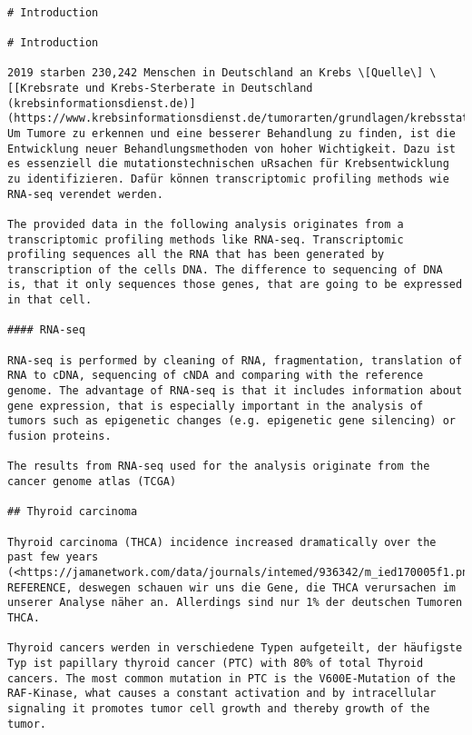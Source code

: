 \documentclass[
  parskip,
  oneside]{scrreprt}
\begin{document}
\begin{verbatim}

# Introduction

# Introduction

2019 starben 230,242 Menschen in Deutschland an Krebs \[Quelle\] \[[Krebsrate und Krebs-Sterberate in Deutschland (krebsinformationsdienst.de)](https://www.krebsinformationsdienst.de/tumorarten/grundlagen/krebsstatistiken.php)\]. Um Tumore zu erkennen und eine besserer Behandlung zu finden, ist die Entwicklung neuer Behandlungsmethoden von hoher Wichtigkeit. Dazu ist es essenziell die mutationstechnischen uRsachen für Krebsentwicklung zu identifizieren. Dafür können transcriptomic profiling methods wie RNA-seq verendet werden.

The provided data in the following analysis originates from a transcriptomic profiling methods like RNA-seq. Transcriptomic profiling sequences all the RNA that has been generated by transcription of the cells DNA. The difference to sequencing of DNA is, that it only sequences those genes, that are going to be expressed in that cell.

#### RNA-seq

RNA-seq is performed by cleaning of RNA, fragmentation, translation of RNA to cDNA, sequencing of cNDA and comparing with the reference genome. The advantage of RNA-seq is that it includes information about gene expression, that is especially important in the analysis of tumors such as epigenetic changes (e.g. epigenetic gene silencing) or fusion proteins.

The results from RNA-seq used for the analysis originate from the cancer genome atlas (TCGA)

## Thyroid carcinoma 

Thyroid carcinoma (THCA) incidence increased dramatically over the past few years (<https://jamanetwork.com/data/journals/intemed/936342/m_ied170005f1.png>) REFERENCE, deswegen schauen wir uns die Gene, die THCA verursachen im unserer Analyse näher an. Allerdings sind nur 1% der deutschen Tumoren THCA.

Thyroid cancers werden in verschiedene Typen aufgeteilt, der häufigste Typ ist papillary thyroid cancer (PTC) with 80% of total Thyroid cancers. The most common mutation in PTC is the V600E-Mutation of the RAF-Kinase, what causes a constant activation and by intracellular signaling it promotes tumor cell growth and thereby growth of the tumor.


\end{verbatim}
\end{document}
